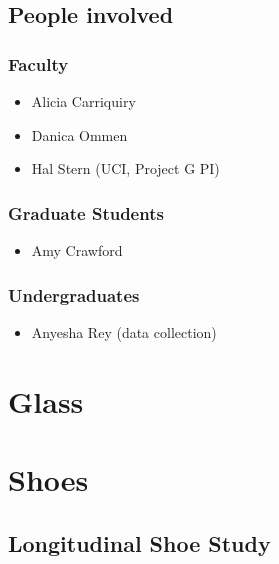\documentclass[]{book}
\providecommand{\tightlist}{%
  \setlength{\itemsep}{0pt}\setlength{\parskip}{0pt}}
\begin{document}
\hypertarget{people-involved-1}{%
\section{People involved}\label{people-involved-1}}

\hypertarget{faculty-1}{%
\subsection{Faculty}\label{faculty-1}}

\begin{itemize}
\tightlist
\item
  Alicia Carriquiry
\item
  Danica Ommen
\item
  Hal Stern (UCI, Project G PI)
\end{itemize}

\hypertarget{graduate-students-1}{%
\subsection{Graduate Students}\label{graduate-students-1}}

\begin{itemize}
\tightlist
\item
  Amy Crawford
\end{itemize}

\hypertarget{undergraduates-1}{%
\subsection{Undergraduates}\label{undergraduates-1}}

\begin{itemize}
\tightlist
\item
  Anyesha Rey (data collection)
\end{itemize}

\hypertarget{glass}{%
\chapter{Glass}\label{glass}}

\hypertarget{shoes}{%
\chapter{Shoes}\label{shoes}}

\hypertarget{longitudinal}{%
\section{Longitudinal Shoe Study}\label{longitudinal}}
\end{document}
